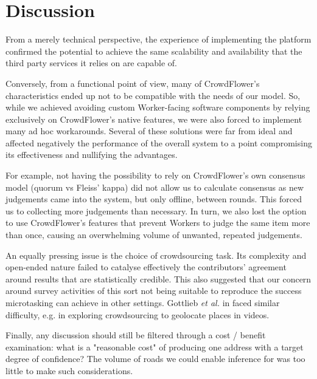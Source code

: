 \section{Discussion}

From a merely technical perspective, the experience of implementing the platform confirmed the potential to achieve the same scalability and availability that the third party services it relies on are capable of.

Conversely, from a functional point of view, many of CrowdFlower's characteristics ended up not to be compatible with the needs of our model. So, while we achieved avoiding custom Worker-facing software components by relying exclusively on CrowdFlower's native features, we were also forced to implement many ad hoc workarounds. Several of these solutions were far from ideal and affected negatively the performance of the overall system to a point compromising its effectiveness and nullifying the advantages. 

For example, not having the possibility to rely on CrowdFlower's own consensus model (quorum vs Fleiss' kappa) did not allow us to calculate consensus as new judgements came into the system, but only offline, between rounds. This forced us to collecting more judgements than necessary. In turn, we also lost the option to use CrowdFlower's features that prevent Workers to judge the same item more than once, causing an overwhelming volume of unwanted, repeated judgements. 

An equally pressing issue is the choice of crowdsourcing task. Its complexity and open-ended nature failed to catalyse effectively the contributors' agreement around results that are statistically credible. This also suggested that our concern around survey activities of this sort not being suitable to reproduce the success microtasking can achieve in other settings. Gottlieb {\it et al.} in \cite{Gottlieb:2012fh} faced similar difficulty, e.g. in exploring crowdsourcing to geolocate places in videos.

Finally, any discussion should still be filtered through a cost / benefit examination: what is a "reasonable cost" of producing one address with a target degree of confidence? The volume of roads we could enable inference for was too little to make such considerations.